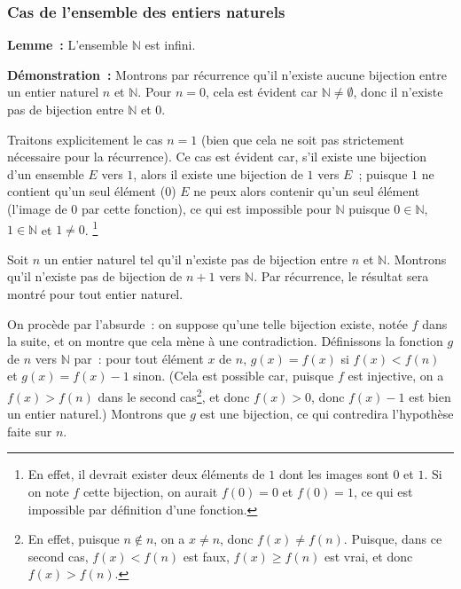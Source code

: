     \done

\subsubsection{Cas de l'ensemble des entiers naturels}

\noindent\textbf{Lemme :} L'ensemble $\mathbb{N}$ est infini. 

\medskip

\noindent\textbf{Démonstration :} Montrons par récurrence qu'il n'existe aucune bijection entre un entier naturel $n$ et $\mathbb{N}$. 
    Pour $n=0$, cela est évident car $\mathbb{N} \neq \emptyset$, donc il n'existe pas de bijection entre $\mathbb{N}$ et $0$.
    
    Traitons explicitement le cas $n=1$ (bien que cela ne soit pas strictement nécessaire pour la récurrence). 
    Ce cas est évident car, s'il existe une bijection d'un ensemble $E$ vers $1$, alors il existe une bijection de $1$ vers $E$ ; puisque $1$ ne contient qu'un seul élément ($0$) $E$ ne peux alors contenir qu'un seul élément (l'image de $0$ par cette fonction), ce qui est impossible pour $\mathbb{N}$ puisque $0 \in \mathbb{N}$, $1 \in \mathbb{N}$ et $1 \neq 0$.%
    \footnote{
        En effet, il devrait exister deux éléments de $1$ dont les images sont $0$ et $1$. 
        Si on note $f$ cette bijection, on aurait $f(0) = 0$ et $f(0) = 1$, ce qui est impossible par définition d'une fonction.
    }

    Soit $n$ un entier naturel tel qu'il n'existe pas de bijection entre $n$ et $\mathbb{N}$. 
    Montrons qu'il n'existe pas de bijection de $n+1$ vers $\mathbb{N}$. 
    Par récurrence, le résultat sera montré pour tout entier naturel.

    On procède par l'absurde : on suppose qu'une telle bijection existe, notée $f$ dans la suite, et on montre que cela mène à une contradiction. 
    Définissons la fonction $g$ de $n$ vers $\mathbb{N}$ par : pour tout élément $x$ de $n$, $g(x) = f(x)$ si $f(x) < f(n)$ et $g(x) = f(x)-1$ sinon. 
    (Cela est possible car, puisque $f$ est injective, on a $f(x) > f(n)$ dans le second cas\footnote{En effet, puisque $n \notin n$, on a $x \neq n$, donc $f(x) \neq f(n)$. Puisque, dans ce second cas, $f(x) < f(n)$ est faux, $f(x) \geq f(n)$ est vrai, et donc $f(x) > f(n)$.}, et donc $f(x) > 0$, donc $f(x) - 1$ est bien un entier naturel.)
    Montrons que $g$ est une bijection, ce qui contredira l'hypothèse faite sur $n$. 

